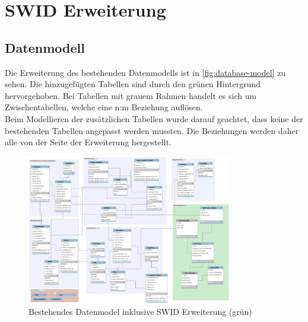 \section{SWID Erweiterung}
\label{swiderweiterung}

\subsection{Datenmodell}

Die Erweiterung des bestehenden Datenmodells ist in \autoref{fig:database-model}
zu sehen. Die hinzugefügten Tabellen sind durch den grünen Hintergrund
hervorgehoben. Bei Tabellen mit grauem Rahmen handelt es sich um
Zwischentabellen, welche eine n:m Beziehung auflösen.\\
Beim Modellieren der zusätzlichen Tabellen wurde darauf geachtet, dass keine der
bestehenden Tabellen angepasst werden mussten. Die Beziehungen werden daher alle
von der Seite der Erweiterung hergestellt.

\begin{figure}[h!]
	\centering
	\includegraphics[angle=90,width=0.8\textwidth]{./images/db/database-model}
	\caption{Bestehendes Datenmodel inklusive SWID Erweiterung (grün)}
	\label{fig:database-model}
\end{figure}

